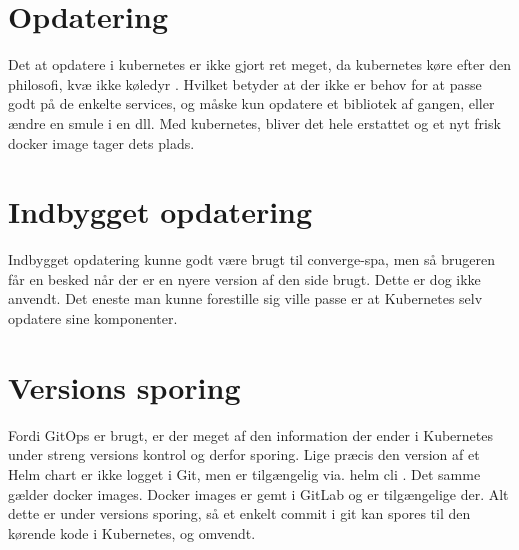 \section{Opdatering}

Det at opdatere i kubernetes er ikke gjort ret meget, da kubernetes køre efter den philosofi, kvæ ikke køledyr . Hvilket betyder at der ikke er behov for at passe godt på de enkelte services, og måske kun opdatere et bibliotek af gangen, eller ændre en smule i en dll. Med kubernetes, bliver det hele erstattet og et nyt frisk docker image tager dets plads.

\section{Indbygget opdatering}

Indbygget opdatering kunne godt være brugt til converge-spa, men så brugeren får en besked når der er en nyere version af den side brugt. Dette er dog ikke anvendt. Det eneste man kunne forestille sig ville passe er at Kubernetes selv opdatere sine komponenter.

\section{Versions sporing}

Fordi GitOps er brugt, er der meget af den information der ender i Kubernetes under streng versions kontrol og derfor sporing. Lige præcis den version af et Helm chart er ikke logget i Git, men er tilgængelig via. helm cli . Det samme gælder docker images. Docker images er gemt i GitLab og er tilgængelige der. Alt dette er under versions sporing, så et enkelt commit i git kan spores til den kørende kode i Kubernetes, og omvendt.
